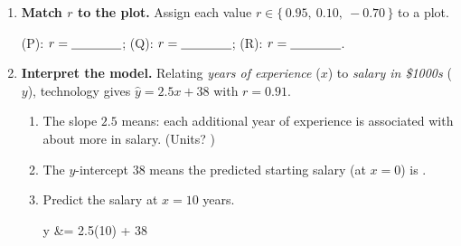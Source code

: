 \documentclass[10pt]{article}
\newcommand{\lgrid}[4]{%
  \draw[step=1, linegray!40, very thin] (#1,#3) grid (#2,#4);
  \draw[->, semithick, charcoal] (#1,0)--(#2,0) node[below right, font=\scriptsize]{$x$};
  \draw[->, semithick, charcoal] (0,#3)--(0,#4) node[left, font=\scriptsize]{$y$};}
\newcommand{\dpt}[2]{\fill[navy] (#1,#2) circle (2.8pt);}
\begin{document}
\begin{tcolorbox}[colback=white, colframe=black!40, title=\textbf{Tier A --- Approaching Proficiency},
    fonttitle=\bfseries, arc=1.5mm, left=3mm, right=3mm, top=2mm, bottom=2mm, breakable]
\begin{enumerate}[leftmargin=1.7em, itemsep=10pt]
  \item \textbf{Match $r$ to the plot.} Assign each value $r\in\{\,0.95,\ 0.10,\ -0.70\,\}$ to a plot.
        \begin{center}
        \hspace{0.4cm}
        \hspace{0.4cm}
        \end{center}
        (P): $r=\blank{1.4cm}$; \quad (Q): $r=\blank{1.4cm}$; \quad (R): $r=\blank{1.4cm}$.
  \item \textbf{Interpret the model.} Relating \emph{years of experience} ($x$) to \emph{salary in \$1000s}
        ($y$), technology gives $\hat y=2.5x+38$ with $r=0.91$.
        \begin{enumerate}[label=(\alph*), leftmargin=1.8em, itemsep=4pt]
          \item The slope $2.5$ means: each additional year of experience is associated with about
                \blank{2.2cm} more in salary. \quad (Units? \blank{2.2cm})
          \item The $y$-intercept $38$ means the predicted starting salary (at $x=0$) is \blank{2.2cm}.
          \item Predict the salary at $x=10$ years.
                \begin{work}
                  \hat y &= 2.5(10) + 38 \\

\end{work}
\end{enumerate}
\end{enumerate}
\end{tcolorbox}
\end{document}
